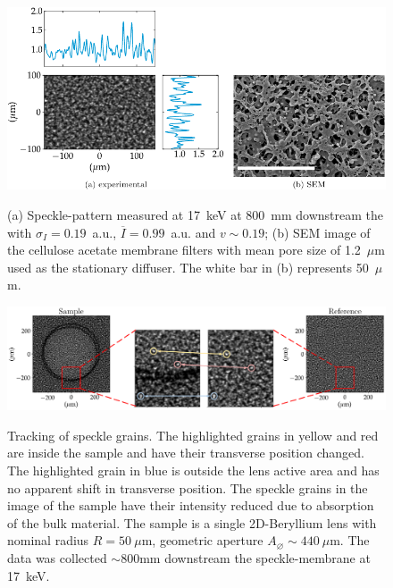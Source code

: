 \begin{refsection}
\begin{figure}[t]
        \centering
        {\includegraphics[width=0.6\linewidth]{figures/ch04/SpecklePattern.pdf}}
        \caption[Speckle-pattern and the stationary diffuser]{(a) Speckle-pattern measured at 17~keV at 800~mm downstream the with $\sigma_I=0.19$~a.u., $\overline{I}=0.99$~a.u. and $v\sim0.19$; (b) SEM image of the cellulose acetate membrane filters with mean pore size of 1.2~$\mu$m used as the stationary diffuser. The white bar in (b) represents 50~$\mu$m.} \label{fig:SpecklePattern}
\end{figure}

\begin{figure}[t]
        \centering
        {\includegraphics[width=1\linewidth]{figures/ch04/speckle_tracking.pdf}}
        \caption[Tracking of speckle grain]{Tracking of speckle grains. The highlighted grains in yellow and red are inside the sample and have their transverse position changed. The highlighted grain in blue is outside the lens active area and has no apparent shift in transverse position. The speckle grains in the image of the sample have their intensity reduced due to absorption of the bulk material. The sample is a single 2D-Beryllium lens with nominal radius $R=50~\mu\text{m}$, geometric aperture $A_{\diameter}\sim440~\mu\text{m}$. The data was collected $\sim$800mm downstream the speckle-membrane at 17~keV.} \label{fig:speckle_tracking}
\end{figure}


\end{refsection}
